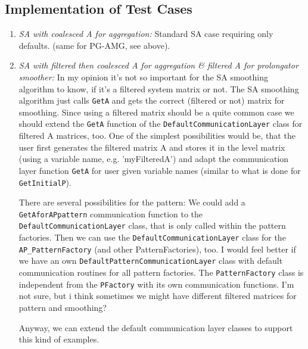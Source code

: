 \subsection{Implementation of Test Cases}
\begin{enumerate}
 \item \textit{SA with coalesced A for aggregation:} Standard SA case requiring only defaults. (same for PG-AMG, see above).
 \item \textit{SA with filtered then coalesced A for aggregation \& filtered A for prolongator smoother:} In my opinion it's not so important for the SA smoothing algorithm to know, if it's a filtered system matrix or not. The SA smoothing algorithm just calls \verb|GetA| and gets the correct (filtered or not) matrix for smoothing. Since using a filtered matrix should be a quite common case we should extend the \verb|GetA| function of the \verb|DefaultCommunicationLayer| class for filtered A matrices, too. One of the simplest possibilities would be, that the user first generates the filtered matrix A and stores it in the level matrix (using a variable name, e.g. 'myFilteredA') and adapt the communication layer function \verb|GetA| for user given variable names (similar to what is done for \verb|GetInitialP|). 

There are several possibilities for the pattern: We could add a \verb|GetAforAPpattern| communication function to the \verb|DefaultCommunicationLayer| class, that is only called within the pattern factories. Then we can use the \verb|DefaultCommunicationLayer| class for the \verb|AP_PatternFactory| (and other PatternFactories), too. I would feel better if we have an own \verb|DefaultPatternCommunicationLayer| class with default communication routines for all pattern factories. The \verb|PatternFactory| class is independent from the \verb|PFactory| with its own communication functions. I'm not sure, but i think sometimes we might have different filtered matrices for pattern and smoothing?

Anyway, we can extend the default communication layer classes to support this kind of examples.
 

\end{enumerate}
